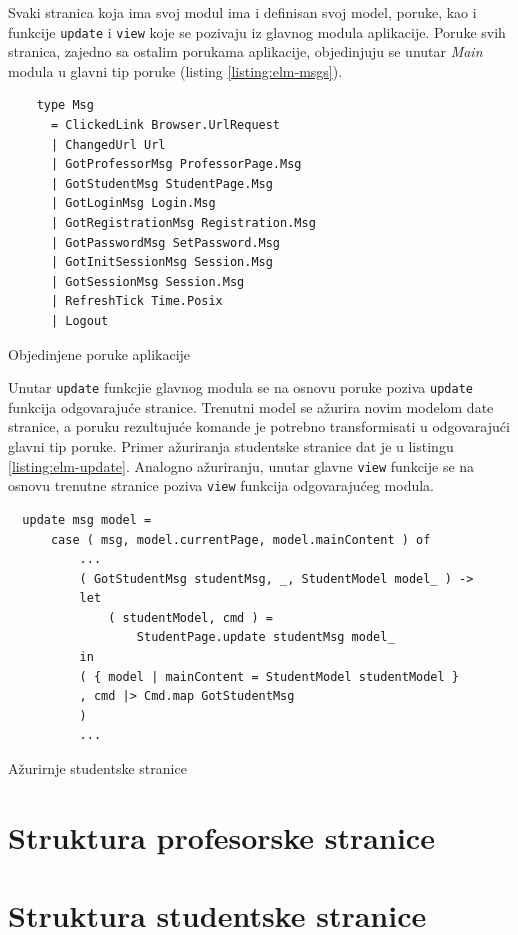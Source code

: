 \documentclass[12pt,oneside]{memoir}
\begin{document}
Svaki stranica koja ima svoj modul ima i definisan svoj model, poruke, kao i funkcije \texttt{update} i \texttt{view} koje
se pozivaju iz glavnog modula aplikacije. Poruke svih stranica, zajedno sa ostalim porukama aplikacije, objedinjuju
se unutar \emph{Main} modula u glavni tip poruke (listing \ref{listing:elm-msgs}).
\begin{listing}[h]
  \begin{verbatim}
    type Msg
      = ClickedLink Browser.UrlRequest
      | ChangedUrl Url
      | GotProfessorMsg ProfessorPage.Msg
      | GotStudentMsg StudentPage.Msg
      | GotLoginMsg Login.Msg
      | GotRegistrationMsg Registration.Msg
      | GotPasswordMsg SetPassword.Msg
      | GotInitSessionMsg Session.Msg
      | GotSessionMsg Session.Msg
      | RefreshTick Time.Posix
      | Logout
  \end{verbatim}
  \caption{Objedinjene poruke aplikacije}
  \label{listing:elm-msgs}
  \end{listing}
Unutar \texttt{update} funkcjie glavnog modula se na osnovu poruke poziva \texttt{update} funkcija 
odgovarajuće stranice. Trenutni model se ažurira novim modelom date stranice, a poruku rezultujuće komande je potrebno
transformisati u odgovarajući glavni tip poruke. Primer ažuriranja studentske stranice dat je u listingu \ref{listing:elm-update}.
Analogno ažuriranju, unutar glavne \texttt{view} funkcije se na osnovu trenutne stranice poziva \texttt{view} funkcija odgovarajućeg modula.  
\begin{listing}[h]
\begin{verbatim}
  update msg model =
      case ( msg, model.currentPage, model.mainContent ) of
          ...
          ( GotStudentMsg studentMsg, _, StudentModel model_ ) ->
          let
              ( studentModel, cmd ) =
                  StudentPage.update studentMsg model_
          in
          ( { model | mainContent = StudentModel studentModel }
          , cmd |> Cmd.map GotStudentMsg
          )
          ...
\end{verbatim}
\caption{Ažurirnje studentske stranice}
\label{listing:elm-update}
\end{listing} 

\section{Struktura profesorske stranice}

\section{Struktura studentske stranice}
\end{document}

